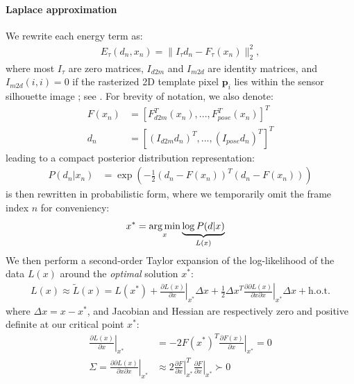\paragraph{Laplace approximation}
\label{sec:posterior}
% 
We rewrite each energy term as: 
\begin{align}
E_{\tau}(d_n, x_n) = \|I_{\tau} d_n - F_{\tau} (x_n)\|_2^2,
\end{align} 
where most $I_{\tau}$ are zero matrices, $I_{d2m}$ and $I_{m2d}$ are identity matrices, and $I_{m2d}(i,i)=0$ if the rasterized 2D template pixel $\mathbf{p}_i$ lies within the sensor silhouette image ; see \cite{htrack}.
For brevity of notation, we also denote:
% 
\begin{align*}
F(x_n) &= \left[F_{d2m}^T(x_n), ..., F_{pose}^T(x_n)\right]^T \\
d_n &= \left[(I_{d2m} d_n)^T, ..., (I_{pose} d_n)^T\right]^T
\end{align*}
% 
leading to a compact posterior distribution representation:
% 
\begin{align}
P(d_n|x_n) &= \exp \left( - \tfrac{1}{2}(d_n - F(x_n))^T (d_n - F(x_n)) \right)
\label{eq:posterior}
\end{align}
% 
 is then rewritten in probabilistic form, where we temporarily omit the frame index $n$ for conveniency:
%
\begin{align}
x^* &= \operatorname*{arg\,min}_{x} \underbrace{\log  P(d|x)}_{L(x)}
\label{eq:independent}
\end{align}
%
We then perform a second-order Taylor expansion of the log-likelihood of the data $L(x)$ around the \emph{optimal} solution $x^*$:
%
\begin{align*}
L(x) \approx \tilde{L}(x) = L(x^*)   
+ \left. \tfrac{\partial L(x) }{\partial x}\right|_{x^*}  \Delta x 
+ \left. \tfrac{1}{2} \Delta x^T\tfrac{\partial \partial L(x)}{\partial x \partial x} \right|_{x^*} \Delta x + \text{h.o.t.}
\end{align*}
%
where $\Delta x=x - x^*$, and Jacobian and Hessian are respectively zero and positive definite at our critical point $x^*$:
%
\begin{align}
\left.\tfrac{\partial L(x)}{\partial x} \right|_{x^*} &= - 2 F(x^*)^T 
\left.\tfrac{\partial F(x)}{\partial x}\right|_{x^*} = 0 
\label{eq:taylor-jacobian}
\\
\Sigma = \left. \tfrac{\partial \partial L(x)}{\partial x \partial x}  \right|_{x^*}  
& \approx 2
\left.\tfrac{\partial F}{\partial x}\right|_{x^*}^T  
\left.\tfrac{\partial F}{\partial x}\right|_{x^*}
\succ 0
\label{eq:taylor-hessian}
\end{align}

